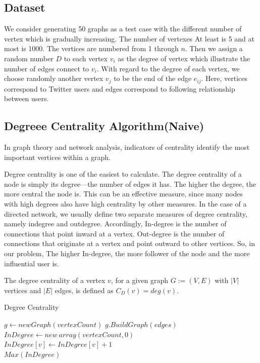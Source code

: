 \documentclass[twocolumn,11pt]{asme2ej}
\begin{document}
\subsection{Dataset}
We consider generating 50 graphs as a test case with the different number of vertex which is gradually increasing. The number of vertexes At least is 5 and at most is 1000. The vertices are numbered from 1 through $n$. Then we assign a random number $D$ to each vertex $v_i$ as the degree of vertex which illustrate the number of edges connect to $v_i$. With regard to the degree of each vertex, we choose randomly another vertex $v_j$ to be the end of the edge $e_{ij}$. Here, vertices correspond to Twitter users and edges correspond to following relationship between users.

\subsection{Degreee Centrality Algorithm(Naive)}
In graph theory and network analysis, indicators of centrality identify the most important vertices within a graph.\cite{updc}

Degree centrality is one of the easiest to calculate. The degree centrality of a node is simply its degree—the number of edges it has. The higher the degree, the more central the node is. This can be an effective measure, since many nodes with high degrees also have high centrality by other measures.\cite{upddc} In the case of a directed network, we usually define two separate measures of degree centrality, namely indegree and outdegree. Accordingly, In-degree is the number of connections that point inward at a vertex. Out-degree is the number of connections that originate at a vertex and point outward to other vertices. So, in our problem, The higher In-degree, the more follower of the node and the more influential user is.

The degree centrality of a vertex $v$, for a given graph $G:=(V,E)$ with $|V|$ vertices and $|E|$ edges, is defined as $C_{D}(v)= deg(v)$.

\begin{algorithm}[H]
	\caption{Degree Centrality}
	\begin{algorithmic}[1]		
		\State $g \leftarrow new Graph(vertexCount)$ 
		\State $g.BuildGraph(edges)$
		\\
		\State {}
		\State $InDegree \leftarrow new \ array(vertexCount,0)$
		\\
		\State $InDegree[v] \leftarrow InDegree[v] + 1$
		\EndIf
		\EndFor
		\EndFor
		\\	
		\Return $Max(InDegree)$
		\EndFunction	
	\end{algorithmic}
\end{algorithm}
\end{document}
